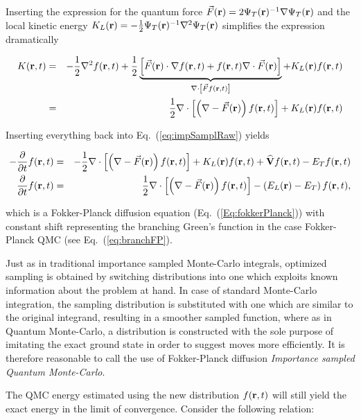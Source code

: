 Inserting the expression for the quantum force $\vec F(\mathbf{r}) = 2\Psi_T(\mathbf{r})^{-1}\nabla\Psi_T(\mathbf{r})$ and the local kinetic energy $K_L(\mathbf{r}) = -\frac{1}{2}\Psi_T(\mathbf{r})^{-1}\nabla^2\Psi_T(\mathbf{r})$ simplifies the expression dramatically

\begin{eqnarray*}
 K(\mathbf{r}, t) &=& - \frac{1}{2}\nabla^2 f(\mathbf{r}, t) + \frac{1}{2}\underbrace{\left[\vec F(\mathbf{r})\cdot \nabla f(\mathbf{r}, t) + f(\mathbf{r}, t)\nabla\cdot \vec F(\mathbf{r})\right]}_{\nabla\cdot\left[\vec F f(\mathbf{r}, t)\right]} + K_L(\mathbf{r})f(\mathbf{r}, t)\\
         &=& \frac{1}{2}\nabla\cdot \left[\left(\nabla - \vec F(\mathbf{r})\right)f(\mathbf{r}, t)\right] + K_L(\mathbf{r})f(\mathbf{r}, t)
\end{eqnarray*}

Inserting everything back into Eq.~(\ref{eq:impSamplRaw}) yields

\begin{eqnarray}
 -\frac{\partial}{\partial t}f(\mathbf{r}, t) &=& -\frac{1}{2}\nabla\cdot \left[\left(\nabla - \vec F(\mathbf{r})\right)f(\mathbf{r}, t)\right] + K_L(\mathbf{r})f(\mathbf{r}, t) + {\bf\widehat{V}}f(\mathbf{r}, t) - E_Tf(\mathbf{r},t) \nonumber\\
  \frac{\partial}{\partial t}f(\mathbf{r}, t)  &=& \frac{1}{2}\nabla\cdot \left[\left(\nabla - \vec F(\mathbf{r})\right)f(\mathbf{r}, t)\right] - \left(E_L(\mathbf{r}) - E_T\right)f(\mathbf{r}, t), 
\end{eqnarray}

which is a Fokker-Planck diffusion equation (Eq.~(\ref{Eq:fokkerPlanck})) with constant shift representing the branching Green's function in the case Fokker-Planck QMC (see Eq.~(\ref{eq:branchFP}).

Just as in traditional importance sampled Monte-Carlo integrals, optimized sampling is obtained by switching distributions into one which exploits known information about the problem at hand. In case of standard Monte-Carlo integration, the sampling distribution is substituted with one which are similar to the original integrand, resulting in a smoother sampled function, where as in Quantum Monte-Carlo, a distribution is constructed with the sole purpose of imitating the exact ground state in order to suggest moves more efficiently. It is therefore reasonable to call the use of Fokker-Planck diffusion \textit{Importance sampled Quantum Monte-Carlo}.

The QMC energy estimated using the new distribution $f(\mathbf{r}, t)$ will still yield the exact energy in the limit of convergence. Consider the following relation:

